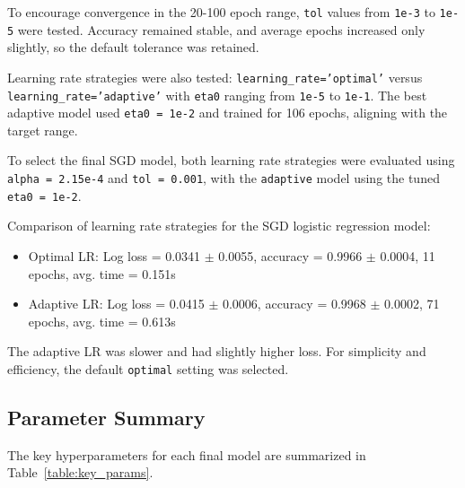 \documentclass{article}      %
\begin{document}
To encourage convergence in the 20-100 epoch range, \texttt{tol} values from \texttt{1e-3} to \texttt{1e-5} were tested. Accuracy remained stable, and average epochs increased only slightly, so the default tolerance was retained.

Learning rate strategies were also tested: \texttt{learning\_rate='optimal'} versus \texttt{learning\_rate='adaptive'} with \texttt{eta0} ranging from \texttt{1e-5} to \texttt{1e-1}. The best adaptive model used \texttt{eta0 = 1e-2} and trained for 106 epochs, aligning with the target range.

To select the final SGD model, both learning rate strategies were evaluated using \texttt{alpha = 2.15e-4} and \texttt{tol = 0.001}, with the \texttt{adaptive} model using the tuned \texttt{eta0 = 1e-2}.

\vspace{0.5em}
\noindent
Comparison of learning rate strategies for the SGD logistic regression model:
\begin{itemize}
  \item Optimal LR: Log loss = 0.0341 $\pm$ 0.0055, accuracy = 0.9966 $\pm$ 0.0004, 11 epochs, avg. time = 0.151s
  \item Adaptive LR: Log loss = 0.0415 $\pm$ 0.0006, accuracy = 0.9968 $\pm$ 0.0002, 71 epochs, avg. time = 0.613s
\end{itemize}
\noindent

The adaptive LR was slower and had slightly higher loss. For simplicity and efficiency, the default \texttt{optimal} setting was selected.

\subsection{Parameter Summary}

The key hyperparameters for each final model are summarized in Table~\ref{table:key_params}.
\end{document}

